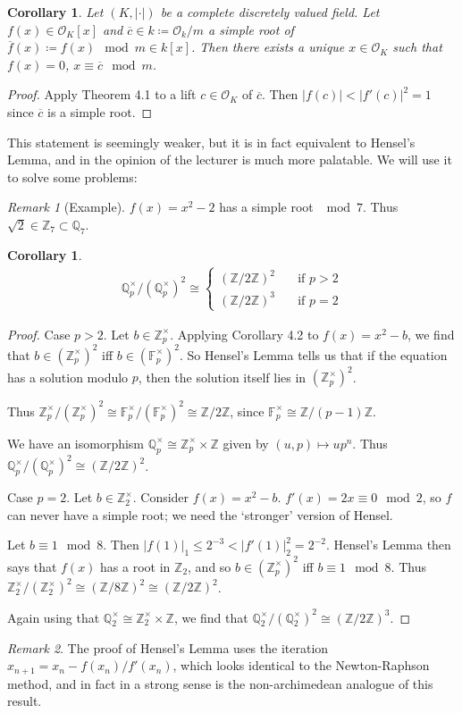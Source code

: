 \documentclass[]{article}
\theoremstyle{custhm}
\theoremstyle{cusdef}
\theoremstyle{custhm}
\theoremstyle{custhm}
\newtheorem{cor}[theorem]{Corollary}
\theoremstyle{custhm}
\theoremstyle{custhm}
\theoremstyle{cusdef}
\theoremstyle{remark}
\newtheorem*{remark*}{Remark}
\newcommand{\Z}{\mathbb{Z}}
\newcommand{\Q}{\mathbb{Q}}
\newcommand{\valk}{(K,|\cdot|)}
\renewcommand{\bar}{\overline}
\renewcommand{\O}{\mathcal{O}}
\begin{document}
\begin{cor}
Let $\valk$ be a complete discretely valued field. Let $f(x)\in \O_K[x]$ and $\bar{c}\in k \coloneqq \O_k/m$ a simple root of $\bar{f}(x) \coloneqq f(x) \mod m\in k[x]$. Then there exists a unique $x\in \O_K$ such that $f(x) = 0$, $x\equiv \bar{c}\mod m$.
\end{cor}
\begin{proof}
Apply Theorem 4.1 to a lift $c\in \O_K$ of $\bar{c}$. Then $|f(c)| < |f'(c)|^2 = 1$ since $\bar{c}$ is a simple root.
\end{proof}
This statement is seemingly weaker, but it is in fact equivalent to Hensel's Lemma, and in the opinion of the lecturer is much more palatable. We will use it to solve some problems:
\begin{remark*}[Example]
$f(x) = x^2 - 2$ has a simple root $\mod 7$. Thus $\sqrt{2} \in \Z_7 \subset \Q_7$.
\end{remark*} 
\begin{cor}\ 
\begin{align*}
\Q_p^\times/\left(\Q_p^\times\right)^2 \cong \left\lbrace \begin{array}{cc} \left(\Z/2\Z\right)^2 &\quad\textrm{if }p > 2\\ \left(\Z/2\Z\right)^3&\quad\textrm{if }p = 2\end{array}\right.
\end{align*}
\end{cor}
\begin{proof}
Case $p > 2$. Let $b\in \Z_p^\times$. Applying Corollary 4.2 to $f(x) = x^2 - b$, we find that $b\in (\Z_p^\times)^2$ iff $b\in \left(\mathbb{F}_p^\times\right)^2$. So Hensel's Lemma tells us that if the equation has a solution modulo $p$, then the solution itself lies in $(\Z_p^\times)^2$.

Thus $\Z_p^\times/(\Z_p^\times)^2 \cong \mathbb{F}_p^\times/(\mathbb{F}_p^\times)^2 \cong \Z/2\Z$, since $\mathbb{F}_p^\times \cong \Z/(p-1)\Z$.

We have an isomorphism $\Q_p^\times \cong \Z_p^\times \times \Z$ given by $(u,p)\mapsto up^n$. Thus $\Q_p^\times/(\Q_p^\times)^2\cong (\Z/2\Z)^2$.

Case $p = 2$. Let $b \in \Z_2^\times$. Consider $f(x) = x^2 - b$. $f'(x) = 2x \equiv 0\mod 2$, so $f$ can never have a simple root; we need the `stronger' version of Hensel.

Let $b\equiv 1\mod 8$. Then $|f(1)|_1 \le 2^{-3} < |f'(1)|_2^2 = 2^{-2}$. Hensel's Lemma then says that $f(x)$ has a root in $\Z_2$, and so $b\in(\Z_p^\times)^2$ iff $b\equiv 1\mod 8$. Thus $\Z_2^\times/(\Z_2^\times)^2 \cong (\Z/8\Z)^2 \cong (\Z/2\Z)^2$.

Again using that $\Q_2^\times \cong \Z_2^\times \times \Z$, we find that $\Q_2^\times/(\Q_2^\times)^2 \cong (\Z/2\Z)^3$.
\end{proof}
\begin{remark*}
The proof of Hensel's Lemma uses the iteration $x_{n+1} = x_n - f(x_n)/f'(x_n)$, which looks identical to the Newton-Raphson method, and in fact in a strong sense is the non-archimedean analogue of this result.
\end{remark*}
\end{document}
